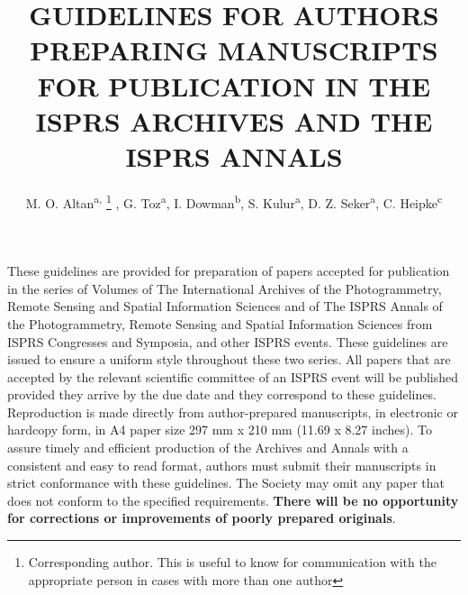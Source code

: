 \documentclass{isprs}
\begin{document}
\title{GUIDELINES FOR AUTHORS PREPARING MANUSCRIPTS FOR PUBLICATION IN THE ISPRS ARCHIVES AND THE ISPRS ANNALS}

\author{
 M. O. Altan\textsuperscript{a, }\thanks{Corresponding author. This is useful to know for communication with the appropriate person in cases with more than one author}
 , G. Toz\textsuperscript{a}, I. Dowman\textsuperscript{b}, S. Kulur\textsuperscript{a}, D. Z. Seker\textsuperscript{a}, C. Heipke\textsuperscript{c}}

\address
{
	\textsuperscript{a }ITU, Civil Engineering Faculty, 80626 Maslak Istanbul, Turkey - (oaltan, tozg, kulur, seker)@itu.edu.tr\\
	\textsuperscript{b }Dept. of Geomatic Engineering, University College London, Gower Street, London, WC1E 6BT UK - idowman@ge.ucl.ac.uk\\
	\textsuperscript{c }Institute of Photogrammetry and GeoInformation, Leibniz Universit\"at Hannover, Germany - \\
	heipke@ipi.uni-hannover.de
}


\abstract
{
These guidelines are provided for preparation of papers accepted for publication in the series of Volumes of The International Archives of the Photogrammetry, Remote Sensing and Spatial Information Sciences and of The ISPRS Annals of the Photogrammetry, Remote Sensing and Spatial Information Sciences from ISPRS Congresses and Symposia, and other ISPRS events.  These guidelines are issued to ensure a uniform style throughout these two series. All papers that are accepted by the relevant scientific committee of an ISPRS event will be published provided they arrive by the due date and they correspond to these guidelines. Reproduction is made directly from author-prepared manuscripts, in electronic or hardcopy form, in A4 paper size 297 mm x 210 mm (11.69 x 8.27 inches). To assure timely and efficient production of the Archives and Annals with a consistent and easy to read format, authors must submit their manuscripts in strict conformance with these guidelines. The Society may omit any paper that does not conform to the specified requirements. \textbf{There will be no opportunity for corrections or improvements of poorly prepared originals}.
}

\end{document}
